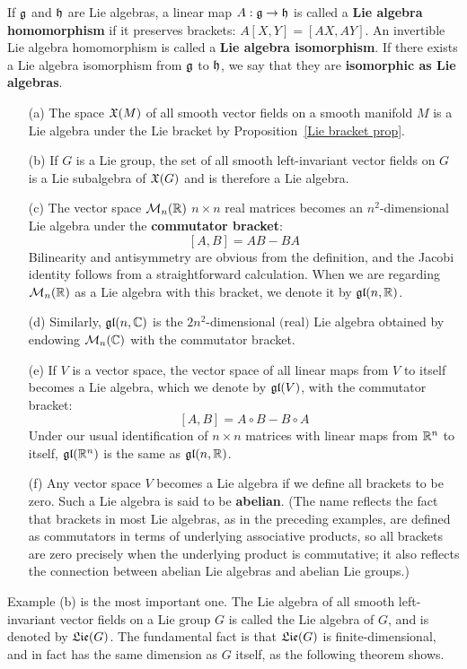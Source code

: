 If $\mathfrak{g}$ and $\mathfrak{h}$ are Lie algebras, a linear map $A:\mathfrak{g}\to\mathfrak{h}$ is called a \textbf{Lie algebra homomorphism} if it preserves brackets: $A[X,Y]=[AX,AY]$. An invertible Lie algebra homomorphism is called a \textbf{Lie algebra isomorphism}. If there exists a Lie algebra isomorphism from $\mathfrak{g}$ to $\mathfrak{h}$, we say that they are \textbf{isomorphic as Lie algebras}.
\begin{example}
\mbox{}
\begin{itemize}
\item[(a)] The space $\mathfrak{X}(M)$ of all smooth vector fields on a smooth manifold $M$ is a Lie algebra under the Lie bracket by Proposition~\ref{Lie bracket prop}.
\item[(b)] If $G$ is a Lie group, the set of all smooth left-invariant vector fields on $G$ is a Lie subalgebra of $\mathfrak{X}(G)$ and is therefore a Lie algebra.
\item[(c)] The vector space $\mathcal{M}_n(\mathbb{R})$ $n\times n$ real matrices becomes an $n^2$-dimensional Lie algebra under the \textbf{commutator bracket}:
\[[A,B]=AB-BA\]
Bilinearity and antisymmetry are obvious from the definition, and the Jacobi identity follows from a straightforward calculation. When we are regarding $\mathcal{M}_n(\mathbb{R})$ as a Lie algebra with this bracket, we denote it by $\mathfrak{gl}(n,\mathbb{R})$.
\item[(d)] Similarly, $\mathfrak{gl}(n,\mathbb{C})$ is the $2n^2$-dimensional $($real$)$ Lie algebra obtained by endowing $\mathcal{M}_n(\mathbb{C})$ with the commutator bracket.
\item[(e)] If $V$ is a vector space, the vector space of all linear maps from $V$ to itself becomes a Lie algebra, which we denote by $\mathfrak{gl}(V)$, with the commutator bracket:
\[[A,B]=A\circ B-B\circ A\]
Under our usual identification of $n\times n$ matrices with linear maps from $\mathbb{R}^n$ to itself, $\mathfrak{gl}(\mathbb{R}^n)$ is the same as $\mathfrak{gl}(n,\mathbb{R})$.
\item[(f)]Any vector space $V$ becomes a Lie algebra if we define all brackets to be zero. Such a Lie algebra is said to be \textbf{abelian}. (The name reflects the fact that brackets in most Lie algebras, as in the preceding examples, are defined as commutators in terms of underlying associative products, so all brackets are zero precisely when the underlying product is commutative; it also reflects the connection between abelian Lie algebras and abelian Lie groups.)
\end{itemize}
\end{example}
Example (b) is the most important one. The Lie algebra of all smooth left-invariant vector fields on a Lie group $G$ is called the Lie algebra of $G$, and is denoted by $\mathfrak{Lie}(G)$. The fundamental fact is that $\mathfrak{Lie}(G)$ is finite-dimensional, and in fact has the same dimension as $G$ itself, as the following theorem shows.
